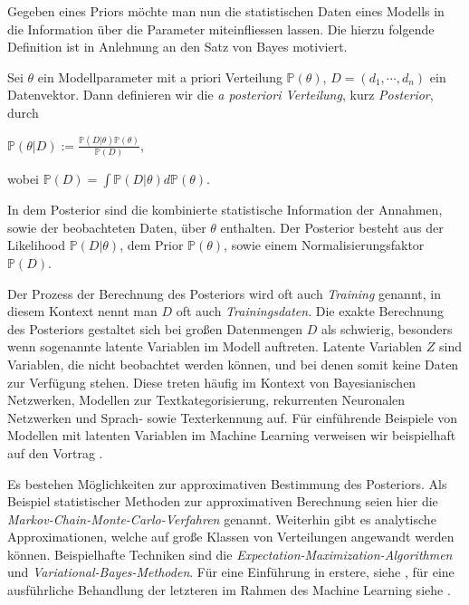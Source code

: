 Gegeben eines Priors möchte man nun die statistischen Daten eines Modells in die Information über die Parameter miteinfliessen lassen. Die hierzu folgende Definition ist in Anlehnung an den Satz von Bayes motiviert.

\begin{defi}
	Sei $\theta$ ein Modellparameter mit a priori Verteilung $\mathbb{P}(\theta)$, $D = 		(d_1, \cdots, d_n)$ ein Datenvektor. Dann definieren wir die \textit{a posteriori 			Verteilung}, kurz \textit{Posterior}, durch
	\begin{center}
		$\mathbb{P}(\theta \vert D) := \frac{\mathbb{P}(D \vert \theta) 
		\mathbb{P}(\theta)}{\mathbb{P}(D)}$,
	\end{center}
	wobei $\mathbb{P}(D) = \int \mathbb{P}(D \vert \theta) d\mathbb{P}(\theta)$.
\end{defi}

In dem Posterior sind die kombinierte statistische Information der Annahmen, sowie der beobachteten Daten, über $\theta$ enthalten. Der Posterior besteht aus der Likelihood $\mathbb{P}(D\vert \theta)$, dem Prior $\mathbb{P}(\theta)$, sowie einem Normalisierungsfaktor $\mathbb{P}(D)$. 

Der Prozess der Berechnung des Posteriors wird oft auch \textit{Training} genannt, in diesem Kontext nennt man $D$ oft auch \textit{Trainingsdaten}. Die exakte Berechnung des Posteriors gestaltet sich bei großen Datenmengen $D$ als schwierig, besonders wenn sogenannte latente Variablen im Modell auftreten. Latente Variablen $Z$ sind Variablen, die nicht beobachtet werden können, und bei denen somit keine Daten zur Verfügung stehen. Diese treten häufig im Kontext von Bayesianischen Netzwerken, Modellen zur Textkategorisierung, rekurrenten Neuronalen Netzwerken und Sprach- sowie Texterkennung auf. Für einführende Beispiele von Modellen mit latenten Variablen im Machine Learning verweisen wir beispielhaft auf den Vortrag \cite{Latent_Variables}. 

Es bestehen Möglichkeiten zur approximativen Bestimmung des Posteriors. Als Beispiel statistischer Methoden zur approximativen Berechnung seien hier die \textit{Markov-Chain-Monte-Carlo-Verfahren} genannt. Weiterhin gibt es analytische Approximationen, welche auf große Klassen von Verteilungen angewandt werden können. Beispielhafte Techniken sind die \textit{Expectation-Maximization-Algorithmen} und \textit{Variational-Bayes-Methoden}. Für eine Einführung in erstere, siehe \cite{Exp_Max}, für eine ausführliche Behandlung der letzteren im Rahmen des Machine Learning siehe \cite{Var_Bayes}. 


